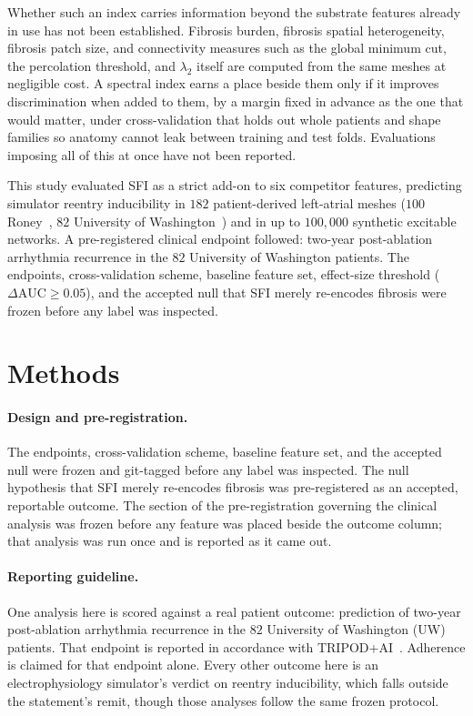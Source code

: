 \documentclass[11pt]{article}
\newcommand{\lam}{\lambda}
\newcommand{\dAUC}{\ensuremath{\Delta\mathrm{AUC}}}
\begin{document}
Whether such an index carries information beyond the substrate features already
in use has not been established. Fibrosis burden, fibrosis spatial
heterogeneity, fibrosis patch size, and connectivity measures such as the global
minimum cut, the percolation threshold, and $\lam_2$ itself are computed from
the same meshes at negligible cost. A spectral index earns a place beside them
only if it improves discrimination when added to them, by a margin fixed in
advance as the one that would matter, under cross-validation that holds out
whole patients and shape families so anatomy cannot leak between training and
test folds. Evaluations imposing all of this at once have not been reported.

This study evaluated SFI as a strict add-on to six competitor features,
predicting simulator reentry inducibility in $182$ patient-derived left-atrial
meshes ($100$ Roney~\cite{roney2022}, $82$ University of
Washington~\cite{uwboyle2025}) and in up to $100{,}000$ synthetic excitable
networks. A pre-registered clinical endpoint followed: two-year post-ablation
arrhythmia recurrence in the $82$ University of Washington patients. The
endpoints, cross-validation scheme, baseline feature set, effect-size threshold
($\dAUC\geq 0.05$), and the accepted null that SFI merely re-encodes fibrosis
were frozen before any label was inspected.

\section{Methods}

\paragraph{Design and pre-registration.} The endpoints, cross-validation scheme,
baseline feature set, and the accepted null were frozen and git-tagged before any
label was inspected. The null hypothesis that SFI merely re-encodes fibrosis was
pre-registered as an accepted, reportable outcome. The section of the
pre-registration governing the clinical analysis was frozen before any feature was
placed beside the outcome column; that analysis was run once and is reported as it
came out.

\paragraph{Reporting guideline.} One analysis here is scored against a real
patient outcome: prediction of two-year post-ablation arrhythmia recurrence in
the $82$ University of Washington (UW) patients. That endpoint
is reported in accordance with TRIPOD+AI~\cite{tripodai2024}. Adherence is claimed for that endpoint alone. Every other outcome
here is an electrophysiology simulator's verdict on reentry inducibility, which
falls outside the statement's remit, though those analyses follow the same
frozen protocol.
\end{document}
